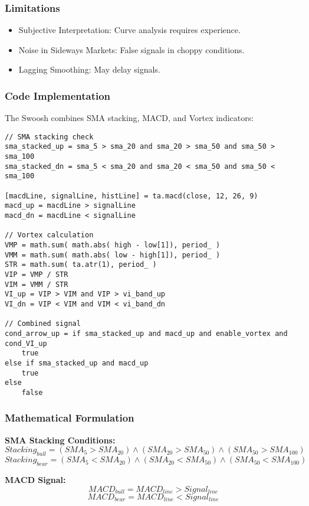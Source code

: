 \documentclass[12pt]{article}
\begin{document}
\subsubsection{Limitations}
\begin{itemize}
\item Subjective Interpretation: Curve analysis requires experience.
\item Noise in Sideways Markets: False signals in choppy conditions.
\item Lagging Smoothing: May delay signals.
\end{itemize}

\subsubsection{Code Implementation}
The Swoosh combines SMA stacking, MACD, and Vortex indicators:

\begin{lstlisting}[language=Pine, caption=Pine Script Code for Swoosh Indicator]
// SMA stacking check
sma_stacked_up = sma_5 > sma_20 and sma_20 > sma_50 and sma_50 > sma_100
sma_stacked_dn = sma_5 < sma_20 and sma_20 < sma_50 and sma_50 < sma_100

[macdLine, signalLine, histLine] = ta.macd(close, 12, 26, 9)
macd_up = macdLine > signalLine
macd_dn = macdLine < signalLine

// Vortex calculation
VMP = math.sum( math.abs( high - low[1]), period_ )
VMM = math.sum( math.abs( low - high[1]), period_ )
STR = math.sum( ta.atr(1), period_ )
VIP = VMP / STR
VIM = VMM / STR
VI_up = VIP > VIM and VIP > vi_band_up
VI_dn = VIP < VIM and VIM < vi_band_dn

// Combined signal
cond_arrow_up = if sma_stacked_up and macd_up and enable_vortex and cond_VI_up
    true
else if sma_stacked_up and macd_up
    true
else 
    false
\end{lstlisting}

\subsubsection{Mathematical Formulation}
\textbf{SMA Stacking Conditions:}
\[
Stacking_{bull} = (SMA_5 > SMA_{20}) \land (SMA_{20} > SMA_{50}) \land (SMA_{50} > SMA_{100})
\]
\[
Stacking_{bear} = (SMA_5 < SMA_{20}) \land (SMA_{20} < SMA_{50}) \land (SMA_{50} < SMA_{100})
\]

\textbf{MACD Signal:}
\[
MACD_{bull} = MACD_{line} > Signal_{line}
\]
\[
MACD_{bear} = MACD_{line} < Signal_{line}
\]
\end{document}
